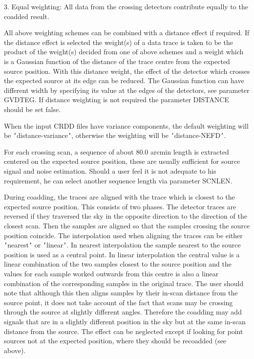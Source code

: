 \begin{small}
{{      3. Equal weighting: All data from the crossing detectors
         contribute equally to the coadded result.

      All above weighting schemes can be combined with a distance effect
      if required. If the distance effect is selected the weight(s) of a
      data trace is taken to be the product of the weight(s) decided
      from one of above schemes and a weight which is a Gaussian function
      of the distance of the trace centre from the expected source position.
      With this distance weight, the effect of the detector which crosses
      the expected source at its edge can be reduced. The Gaussian function
      can have different width by specifying its value at the edges of the
      detectors, see parameter GVDTEG. If distance weighting is not required
      the parameter DISTANCE should be set false.

      When the input CRDD files have variance components, the default
      weighting will be {\tt '}distance-variance{\tt '}, otherwise the weighting
      will be {\tt '}distance-NEFD{\tt '}.

      For each crossing scan, a sequence of about 80.0 arcmin length is
      extracted centered on the expected source position, these are usually
      sufficient for source signal and noise estimation. Should a user feel
      it is not adequate to his requirement, he can select another
      sequence length via parameter SCNLEN.

      During coadding, the traces are aligned with the trace which is
      closest to the expected source position. This consists of two phases.
      The detector traces are reversed if they traversed the sky in the
      opposite direction to the direction of the closest scan. Then the
      samples are aligned so that the samples crossing the source position
      coincide. The interpolation used when aligning the traces can be either
      {\tt '}nearest{\tt '} or {\tt '}linear{\tt '}. In nearest interpolation the sample nearest to
      the source position is used as a central point. In linear interpolation
      the central value is a linear combination of the two samples closest
      to the source position and the values for each sample worked outwards
      from this centre is also a linear combination of the corresponding samples
      in the original trace. The user should note that although this then
      aligns samples by their in-scan distance from the source point, it does
      not take account of the fact that scans may be crossing through the source
      at slightly different angles. Therefore the coadding may add signals that
      are in a slightly different position in the sky but at the same in-scan
      distance from the source. The effect can be neglected except if looking
      for point sources not at the expected position, where they should be
      recoadded (see above).

}}
\end{small}
